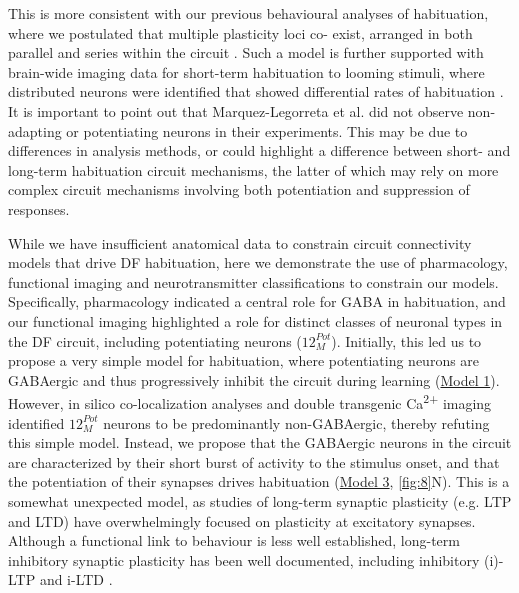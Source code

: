 \documentclass[9pt,lineno]{RandlettLab_elife}
\begin{document}
This is more consistent with our previous behavioural analyses of habituation, where we postulated that multiple plasticity loci co- exist, arranged in both parallel and series within the circuit \cite{Randlett2019-fi}. Such a model is further supported with brain-wide imaging data for short-term habituation to looming stimuli, where distributed neurons were identified that showed differential rates of habituation \cite{Marquez-Legorreta2022-ih}. It is important to point out that Marquez-Legorreta et al. did not observe non-adapting or potentiating neurons in their experiments. This may be due to differences in analysis methods, or could highlight a difference between short- and long-term habituation circuit mechanisms, the latter of which may rely on more complex circuit mechanisms involving both potentiation and suppression of responses. 

While we have insufficient anatomical data to constrain circuit connectivity models that drive DF habituation, here we demonstrate the  use of pharmacology, functional imaging and neurotransmitter classifications to constrain our models. Specifically, pharmacology indicated a central role for GABA in habituation, and our functional imaging highlighted a role for distinct classes of neuronal types in the DF circuit, including potentiating neurons ($12_{M}^{Pot}$). Initially, this led us to propose a very simple model for habituation, where potentiating neurons are GABAergic and thus progressively inhibit the circuit during learning (\underline{Model 1}). However, in silico co-localization analyses and double transgenic Ca\textsuperscript{2+} imaging identified $12_{M}^{Pot}$ neurons to be  predominantly non-GABAergic, thereby refuting this simple model. Instead, we propose that the GABAergic neurons in the circuit are characterized by their short burst of activity to the stimulus onset, and that the potentiation of their synapses drives habituation (\underline{Model 3}, \autoref{fig:8}N). This is a somewhat unexpected model, as studies of long-term synaptic plasticity (e.g. LTP and LTD) have overwhelmingly focused on plasticity at excitatory synapses. Although a functional link to behaviour is less well established, long-term inhibitory synaptic plasticity has been well documented, including inhibitory (i)-LTP  and i-LTD \cite{Castillo2011-tq}.
 
\end{document}

